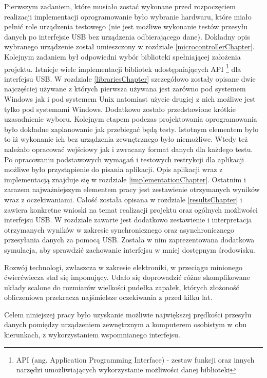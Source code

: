 \documentclass{BscUS}
\begin{document}
\indent Pierwszym zadaniem, które musiało zostać wykonane przed rozpoczęciem realizacji implementacji oprogramowanie było wybranie hardwaru, które miało pełnić role urządzenia testowego (nie jest możliwe wykonanie testów przesyłu danych po interfejsie USB bez urządzenia odbierającego dane). Dokładny opis wybranego urządzenie został umieszczony w rozdziale \ref{microcontrollerChapter}. Kolejnym zadaniem był odpowiedni wybór biblioteki spełniającej założenia projektu. Istnieje wiele implementacji bibliotek udostępniających API \footnote{API (ang. Application Programming Interface) - zestaw funkcji oraz innych narzędzi umożliwiających wykorzystanie możliwości danej biblioteki} dla interfejsu USB. W rozdziale \ref{librariesChapter} szczegółowo zostały opisane dwie najczęściej używane z których pierwsza używana jest zarówno pod systemem Windows jak i pod systemem Unix natomiast użycie drugiej z nich możliwe jest tylko pod systemami Windows. Dodatkowo zostało przedstawione krótkie uzasadnienie wyboru.
\newline
\indent Kolejnym etapem podczas projektowania oprogramowania było dokładne zaplanowanie jak przebiegać będą testy. Istotnym elementem było to iż wykonanie ich bez urządzenia zewnętrznego było niemożliwe. Wtedy też należało opracować wejściowy jak i zwracany format danych dla każdego testu. Po opracowaniu podstawowych wymagań i testowych restrykcji dla aplikacji możliwe było przystąpienie do pisania aplikacji. Opis aplikacji wraz z implementacją znajduje się w rozdziale \ref{implementationChapter}.
\newline
\indent Ostatnim i zarazem najważniejszym elementem pracy jest zestawienie otrzymanych wyników wraz z oczekiwaniami. Całość została opisana w rozdziale \ref{resultsChapter} i zawiera konkretne wnioski na temat realizacji projektu oraz ogólnych możliwości interfejsu USB. W rozdziale zawarte jest dodatkowo zestawienie i interpretacja otrzymanych wyników w zakresie synchronicznego oraz asynchronicznego przesyłania danych za pomocą USB. Została w nim zaprezentowana dodatkowa symulacja, aby sprawdzić zachowanie interfejsu w mniej dostępnym środowisku.


\iffalse
Rozwój technologi, zwłaszcza w zakresie elektroniki, w przeciągu minionego ćwierćwiecza stał się imponujący. Udało się doprowadzić różne skomplikowane układy scalone do rozmiarów wielkości pudełka zapałek, których złożoność obliczeniowa przekracza najśmielsze oczekiwania z przed kilku lat. 

Celem niniejszej pracy było uzyskanie możliwie największej prędkości przesyłu danych pomiędzy urządzeniem zewnętrznym a komputerem osobistym w obu kierunkach, z wykorzystaniem wspomnianego interfejsu. 
\end{document}
